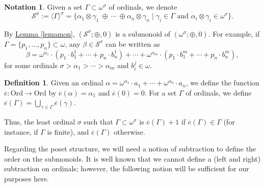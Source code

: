 \documentclass[reqno]{amsart}
\theoremstyle{definition}
\newtheorem{notation}[theorem]{Notation}
\theoremstyle{definition}
\newtheorem{definition}[theorem]{Definition}
\theoremstyle{plain} %
\begin{document}
\begin{notation} Given a set $\Gamma\subset\omega^\sigma$ of ordinals, we denote $$ \mathcal{S}^\sigma:=\langle \Gamma\rangle^\sigma =\{\alpha_1\otimes \gamma_1 \ \oplus \ \cdots \ \oplus \alpha_n\otimes \gamma_n \mid \gamma_i\in\Gamma \text{ and } \alpha_i\otimes\gamma_i\in\omega^\sigma\}.$$
\end{notation}
By \hyperref[lemamon]{Lemma \ref{lemamon}}, $(\mathcal{S}^\sigma;\oplus,0)$ is a submonoid of $(\omega^\sigma;\oplus,0)$. For example, if $ \Gamma=\{p_1,\dots,p_n\}\subset\omega$, any $\beta\in\mathcal{S}^\sigma$ can be written as \begin{equation}\label{ecdes}\beta=\omega^{\alpha_1}\cdot(p_1\cdot b_1^1+\cdots+p_n\cdot b_n^1)+\cdots+\omega^{\alpha_m}\cdot(p_1\cdot b_1^m+\cdots+p_n\cdot b_n^m), 
\end{equation}for some ordinals $\sigma>\alpha_1>\cdots>\alpha_m$ and $b_i^j\in\omega $.
\begin{definition}
    Given an ordinal $\alpha = \omega^{\alpha_1} \cdot a_1 + \cdots + \omega^{\alpha_n} \cdot a_n$, we define the function $\overline{e}: \text{Ord} \to \text{Ord}$ by $\overline{e}(\alpha) = \alpha_1$ and $\overline{e}(0)=0$. For a set $\Gamma$ of ordinals, we define $\overline{e}(\Gamma) = \bigcup_{\gamma\in\Gamma}\overline{e}(\gamma) $.
\end{definition}
Thus, the least ordinal $\sigma$ such that $\Gamma \subset \omega^{\sigma}$ is $\overline{e}(\Gamma)+1$ if $\overline{e}(\Gamma) \in \Gamma$ (for instance, if $\Gamma$ is finite), and $\overline{e}(\Gamma)$ otherwise.

Regarding the poset structure, we will need a notion of subtraction to define the order on the submonoids. It is well known that we cannot define a (left and right) subtraction on ordinals; however, the following notion will be sufficient for our purposes here.
\end{document}
